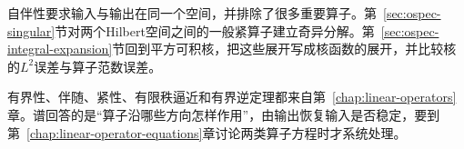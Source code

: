 自伴性要求输入与输出在同一个空间，并排除了很多重要算子。第~\ref{sec:ospec-singular}节对两个Hilbert空间之间的一般紧算子建立奇异分解。第~\ref{sec:ospec-integral-expansion}节回到平方可积核，把这些展开写成核函数的展开，并比较核的$L^2$误差与算子范数误差。

有界性、伴随、紧性、有限秩逼近和有界逆定理都来自第~\ref{chap:linear-operators}章。谱回答的是“算子沿哪些方向怎样作用”，由输出恢复输入是否稳定，要到第~\ref{chap:linear-operator-equations}章讨论两类算子方程时才系统处理。







